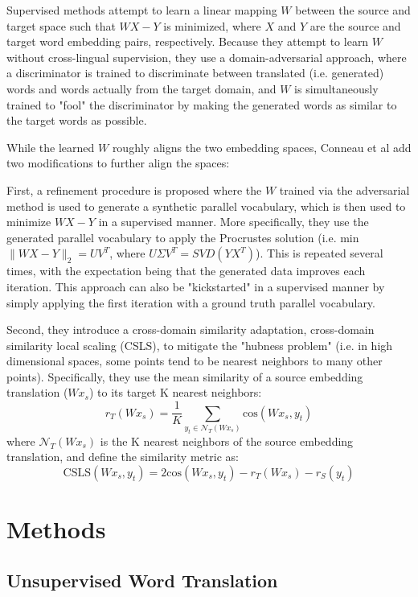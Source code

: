 \documentclass{article}
\begin{document}
Supervised methods attempt to learn a linear mapping $W$ between the source and target
space such that $WX-Y$ is minimized, where $X$ and $Y$ are the source and target word
embedding pairs, respectively. Because they attempt to learn $W$ without cross-lingual 
supervision, they use a domain-adversarial approach, where a discriminator is trained
to discriminate between translated (i.e. generated) words and words actually from the
target domain, and $W$ is simultaneously trained to "fool" the discriminator by making
the generated words as similar to the target words as possible.

While the learned $W$ roughly aligns the two embedding spaces, Conneau et al add two
modifications to further align the spaces:

First, a refinement procedure is proposed where the $W$ trained via the
adversarial method is used to generate a synthetic parallel vocabulary, which is
then used to minimize $WX-Y$ in a supervised manner. More specifically, they use
the generated parallel vocabulary to apply the Procrustes solution (i.e.
min $\|WX-Y\|_2 = UV^T$, where $U\Sigma V^T = SVD(YX^T)$). This is repeated several
times, with the expectation being that the generated data improves each iteration.
This approach can also be "kickstarted" in a supervised manner by simply applying
the first iteration with a ground truth parallel vocabulary.

Second, they introduce a cross-domain similarity adaptation, cross-domain similarity
local scaling (CSLS), to mitigate the "hubness problem"
(i.e. in high dimensional spaces, some points tend to be nearest neighbors
to many other points). Specifically, they use the mean similarity of a source
embedding translation ($Wx_s$) to its target K nearest neighbors:
$$
r_T(Wx_s)=\frac{1}{K}\sum_{y_t \in \mathcal{N}_T(Wx_s)} \text{cos}(Wx_s, y_t)
$$
where $\mathcal{N}_T(Wx_s)$ is the K nearest neighbors of the source embedding
translation, and define the similarity metric as:
$$
\text{CSLS}(Wx_s,y_t)=2\text{cos}(Wx_s, y_t)-r_T(Wx_s)-r_S(y_t)
$$

\section*{Methods}

\subsection*{Unsupervised Word Translation}
\end{document}
